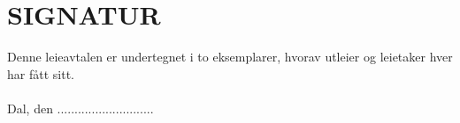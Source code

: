 \section{SIGNATUR}


    Denne leieavtalen er undertegnet i to eksemplarer, hvorav utleier og leietaker hver har fått sitt.\\\\

    Dal, den ............................

    \vspace{2cm}

	\noindent {} \hfill {}
